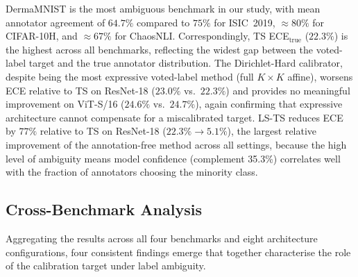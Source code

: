 \documentclass[10pt,journal,compsoc]{IEEEtran}
\begin{document}
DermaMNIST is the most ambiguous benchmark in our study, with mean annotator agreement of $64.7\%$ compared to $75\%$ for ISIC~2019, ${\approx}80\%$ for CIFAR-10H, and ${\approx}67\%$ for ChaosNLI.  Correspondingly, TS ECE$_\text{true}$ ($22.3\%$) is the highest across all benchmarks, reflecting the widest gap between the voted-label target and the true annotator distribution.  The Dirichlet-Hard calibrator, despite being the most expressive voted-label method (full $K\!\times\!K$ affine), worsens ECE relative to TS on ResNet-18 ($23.0\%$ vs.\ $22.3\%$) and provides no meaningful improvement on ViT-S/16 ($24.6\%$ vs.\ $24.7\%$), again confirming that expressive architecture cannot compensate for a miscalibrated target.  LS-TS reduces ECE by $77\%$ relative to TS on ResNet-18 ($22.3\%\to 5.1\%$), the largest relative improvement of the annotation-free method across all settings, because the high level of ambiguity means model confidence (complement 35.3\%) correlates well with the fraction of annotators choosing the minority class.

\subsection{Cross-Benchmark Analysis}
\label{sec:cross-benchmark}

Aggregating the results across all four benchmarks and eight architecture configurations, four consistent findings emerge that together characterise the role of the calibration target under label ambiguity.
\end{document}
